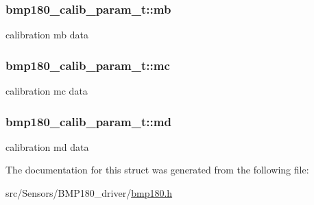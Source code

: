 \subsubsection[{\texorpdfstring{mb}{mb}}]{ bmp180\+\_\+calib\+\_\+param\+\_\+t\+::mb}\hypertarget{structbmp180__calib__param__t_a64bdabef2d55201e68ee49299b966282}{}\label{structbmp180__calib__param__t_a64bdabef2d55201e68ee49299b966282}
calibration mb data 
\subsubsection[{\texorpdfstring{mc}{mc}}]{ bmp180\+\_\+calib\+\_\+param\+\_\+t\+::mc}\hypertarget{structbmp180__calib__param__t_a5abaaaa05802e6d9b2653182e31f655d}{}\label{structbmp180__calib__param__t_a5abaaaa05802e6d9b2653182e31f655d}
calibration mc data 
\subsubsection[{\texorpdfstring{md}{md}}]{ bmp180\+\_\+calib\+\_\+param\+\_\+t\+::md}\hypertarget{structbmp180__calib__param__t_aab92deab6ac7b3bd24feda15460509c3}{}\label{structbmp180__calib__param__t_aab92deab6ac7b3bd24feda15460509c3}
calibration md data 

The documentation for this struct was generated from the following file\+:\begin{DoxyCompactItemize}
\item 
src/\+Sensors/\+B\+M\+P180\+\_\+driver/\hyperlink{bmp180_8h}{bmp180.\+h}\end{DoxyCompactItemize}
